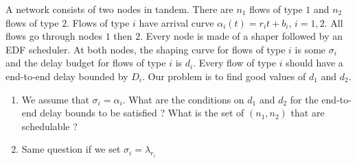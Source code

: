 \begin{problem}
A network consists of two nodes in tandem. There are $n_1$ flows
of type $1$ and $n_2$ flows of type $2$. Flows of type $i$ have
arrival curve $\alpha_i(t)=r_it+b_i$, $i=1,2$. All flows go
through nodes $1$ then $2$. Every node is made of a shaper
followed by an EDF scheduler. At both nodes, the shaping curve for
flows of type $i$ is some $\sigma_i$ and the delay budget for
flows of type $i$ is $d_i$. Every flow of type $i$ should have a
end-to-end delay bounded by $D_i$. Our problem is to find good
values of $d_1$ and $d_2$.
\begin{enumerate}
  \item We assume that $\sigma_i=\alpha_i$. What are the
  conditions on $d_1$ and $d_2$ for the end-to-end delay bounds to
  be satisfied ? What is the set of $(n_1, n_2)$ that are
  schedulable ?
  \item Same question if we set $\sigma_i=\lambda_{r_i}$
\end{enumerate}
\end{problem}
